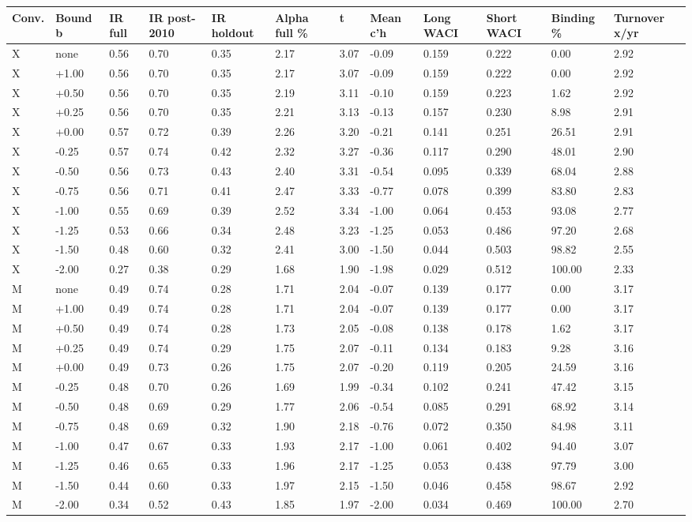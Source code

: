 \begin{tabular}{llllllllllll}
\toprule
Conv. & Bound b & IR full & IR post-2010 & IR holdout & Alpha full \% & t & Mean c'h & Long WACI & Short WACI & Binding \% & Turnover x/yr \\
\midrule
X & none & 0.56 & 0.70 & 0.35 & 2.17 & 3.07 & -0.09 & 0.159 & 0.222 & 0.00 & 2.92 \\
X & +1.00 & 0.56 & 0.70 & 0.35 & 2.17 & 3.07 & -0.09 & 0.159 & 0.222 & 0.00 & 2.92 \\
X & +0.50 & 0.56 & 0.70 & 0.35 & 2.19 & 3.11 & -0.10 & 0.159 & 0.223 & 1.62 & 2.92 \\
X & +0.25 & 0.56 & 0.70 & 0.35 & 2.21 & 3.13 & -0.13 & 0.157 & 0.230 & 8.98 & 2.91 \\
X & +0.00 & 0.57 & 0.72 & 0.39 & 2.26 & 3.20 & -0.21 & 0.141 & 0.251 & 26.51 & 2.91 \\
X & -0.25 & 0.57 & 0.74 & 0.42 & 2.32 & 3.27 & -0.36 & 0.117 & 0.290 & 48.01 & 2.90 \\
X & -0.50 & 0.56 & 0.73 & 0.43 & 2.40 & 3.31 & -0.54 & 0.095 & 0.339 & 68.04 & 2.88 \\
X & -0.75 & 0.56 & 0.71 & 0.41 & 2.47 & 3.33 & -0.77 & 0.078 & 0.399 & 83.80 & 2.83 \\
X & -1.00 & 0.55 & 0.69 & 0.39 & 2.52 & 3.34 & -1.00 & 0.064 & 0.453 & 93.08 & 2.77 \\
X & -1.25 & 0.53 & 0.66 & 0.34 & 2.48 & 3.23 & -1.25 & 0.053 & 0.486 & 97.20 & 2.68 \\
X & -1.50 & 0.48 & 0.60 & 0.32 & 2.41 & 3.00 & -1.50 & 0.044 & 0.503 & 98.82 & 2.55 \\
X & -2.00 & 0.27 & 0.38 & 0.29 & 1.68 & 1.90 & -1.98 & 0.029 & 0.512 & 100.00 & 2.33 \\
M & none & 0.49 & 0.74 & 0.28 & 1.71 & 2.04 & -0.07 & 0.139 & 0.177 & 0.00 & 3.17 \\
M & +1.00 & 0.49 & 0.74 & 0.28 & 1.71 & 2.04 & -0.07 & 0.139 & 0.177 & 0.00 & 3.17 \\
M & +0.50 & 0.49 & 0.74 & 0.28 & 1.73 & 2.05 & -0.08 & 0.138 & 0.178 & 1.62 & 3.17 \\
M & +0.25 & 0.49 & 0.74 & 0.29 & 1.75 & 2.07 & -0.11 & 0.134 & 0.183 & 9.28 & 3.16 \\
M & +0.00 & 0.49 & 0.73 & 0.26 & 1.75 & 2.07 & -0.20 & 0.119 & 0.205 & 24.59 & 3.16 \\
M & -0.25 & 0.48 & 0.70 & 0.26 & 1.69 & 1.99 & -0.34 & 0.102 & 0.241 & 47.42 & 3.15 \\
M & -0.50 & 0.48 & 0.69 & 0.29 & 1.77 & 2.06 & -0.54 & 0.085 & 0.291 & 68.92 & 3.14 \\
M & -0.75 & 0.48 & 0.69 & 0.32 & 1.90 & 2.18 & -0.76 & 0.072 & 0.350 & 84.98 & 3.11 \\
M & -1.00 & 0.47 & 0.67 & 0.33 & 1.93 & 2.17 & -1.00 & 0.061 & 0.402 & 94.40 & 3.07 \\
M & -1.25 & 0.46 & 0.65 & 0.33 & 1.96 & 2.17 & -1.25 & 0.053 & 0.438 & 97.79 & 3.00 \\
M & -1.50 & 0.44 & 0.60 & 0.33 & 1.97 & 2.15 & -1.50 & 0.046 & 0.458 & 98.67 & 2.92 \\
M & -2.00 & 0.34 & 0.52 & 0.43 & 1.85 & 1.97 & -2.00 & 0.034 & 0.469 & 100.00 & 2.70 \\
\bottomrule
\end{tabular}
